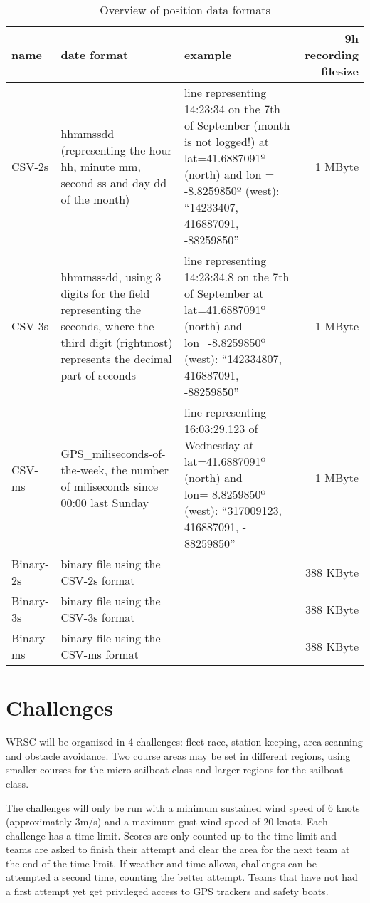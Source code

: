 \documentclass[12pt]{article}
\begin{document}
\begin{landscape}
\centering
\begin{table}
\small{
\begin{tabular}{l|p{6cm}|p{8cm}|r}
name   & date format & example & 9h recording filesize\\
\hline
CSV-2s & hhmmssdd (representing
the hour hh, minute mm, second ss and day dd of the month) &
line representing 14:23:34 on the 7th of September (month is not logged!) at lat=41.6887091º (north) and lon = -8.8259850º (west):
``14233407, 416887091, -88259850'' &
1 MByte\\ \hline

CSV-3s & hhmmsssdd, using 3 digits for the field representing the
seconds, where the third digit (rightmost) represents the decimal part of
seconds & line representing 14:23:34.8 on the 7th of September at
lat=41.6887091º (north) and lon=-8.8259850º (west):
``142334807, 416887091, -88259850''&
1 MByte \\ \hline

CSV-ms & GPS\_miliseconds-of-the-week, the number of miliseconds since 00:00 last Sunday &
line representing 16:03:29.123 of Wednesday at
lat=41.6887091º (north) and lon=-8.8259850º (west):
 “317009123, 416887091, - 88259850”&
1 MByte\\ \hline

Binary-2s &
binary file using the CSV-2s format&
&
388 KByte \\ \hline

Binary-3s &
binary file using the CSV-3s format&
&
388 KByte\\ \hline

Binary-ms &
binary file using the CSV-ms format &
&
388 KByte\\ \hline
\end{tabular}
}
\caption{Overview of position data formats}
\label{tab:dataformats}
\end{table}
\end{landscape}



\section{Challenges}
WRSC will be organized in 4 challenges: fleet race, station keeping, area
scanning and obstacle avoidance.
Two course areas may be set in different regions, using smaller courses for the
micro-sailboat class and larger regions for the sailboat class. 

The challenges will only be run with a minimum sustained wind speed of 6 knots
(approximately 3m/s) and a maximum gust wind speed of 20 knots.
Each challenge has a time limit. Scores are only counted up to the time limit 
and teams are asked to finish their attempt and clear the area for the next team 
at the end of the time limit. 
If weather and time allows, challenges can be attempted a
second time, counting the better attempt. Teams that have not had a
first attempt yet get privileged access to GPS trackers and safety boats.
\end{document}
